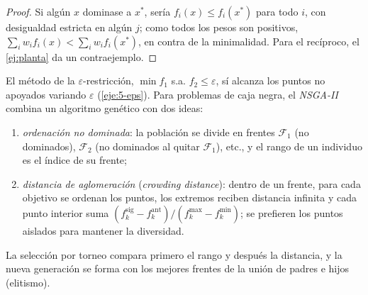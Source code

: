 \begin{proof}
Si algún $x$ dominase a $x^{*}$, sería $f_i(x)\le f_i(x^{*})$ para todo $i$, con desigualdad estricta en algún $j$; como todos los pesos son positivos, $\sum_iw_if_i(x)<\sum_iw_if_i(x^{*})$, en contra de la minimalidad. Para el recíproco, el \cref{ej:planta} da un contraejemplo.
\end{proof}

El método de la $\varepsilon$-restricción, $\min f_1$ s.a. $f_2\le\varepsilon$, sí alcanza los puntos no apoyados variando $\varepsilon$ (\cref{eje:5-eps}). Para problemas de caja negra, el \emph{NSGA-II}~\cite{nsga2} combina un algoritmo genético con dos ideas:
\begin{enumerate}[label=(\alph*)]
  \item \emph{ordenación no dominada}: la población se divide en frentes $\mathcal{F}_1$ (no dominados), $\mathcal{F}_2$ (no dominados al quitar $\mathcal{F}_1$), etc., y el rango de un individuo es el índice de su frente;
  \item \emph{distancia de aglomeración} (\emph{crowding distance}): dentro de un frente, para cada objetivo se ordenan los puntos, los extremos reciben distancia infinita y cada punto interior suma $(f_k^{\text{sig}}-f_k^{\text{ant}})/(f_k^{\max}-f_k^{\min})$; se prefieren los puntos aislados para mantener la diversidad.
\end{enumerate}
La selección por torneo compara primero el rango y después la distancia, y la nueva generación se forma con los mejores frentes de la unión de padres e hijos (elitismo).

